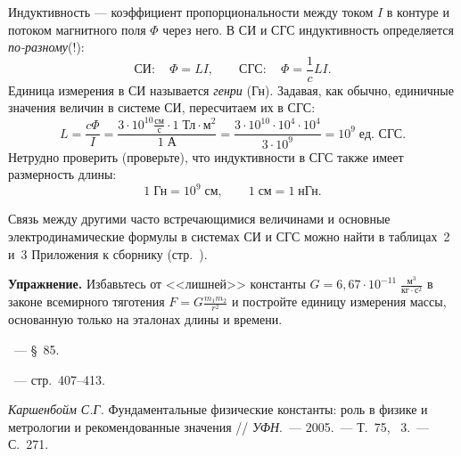 Индуктивность --- коэффициент пропорциональности между током $I$
в контуре и потоком магнитного поля $\Phi$ через него. В СИ и СГС
индуктивность определяется \emph{по-разному}(!):
\[
\text{СИ}:\quad\Phi=LI,\qquad\text{СГС}:\quad\Phi=\frac{1}{c}LI.
\]
Единица измерения в СИ называется \emph{генри} (Гн). Задавая, как
обычно, единичные значения величин в системе СИ, пересчитаем их в
СГС:
\[
L=\frac{c\Phi}{I}=\frac{3\cdot10^{10}\frac{\text{см}}{\text{с}}\cdot1\;\text{Тл}\cdot\text{м}^{2}}{1\;\text{А}}=\frac{3\cdot10^{10}\cdot10^{4}\cdot10^{4}}{3\cdot10^{9}}=10^{9}\;\text{ед. СГС}.
\]
Нетрудно проверить (проверьте), что индуктивности в СГС также имеет
размерность длины:
\[
1\;\text{Гн}=10^{9}\;\text{см},\qquad1\;\text{см}=1\;\text{нГн}.
\]

Связь между другими часто встречающимися величинами и основные
электродинамические формулы в системах СИ и СГС можно найти в
таблицах~2 и~3 Приложения к сборнику (стр.~\pageref{table:SICGS}).

\textbf{Упражнение.} Избавьтесь от <<лишней>> 
константы $G=6{,}67\cdot10^{-11}\;\frac{\text{м}^{3}}{\text{кг}\cdot\text{с}^{2}}$
в законе всемирного тяготения $F=G\frac{m_{1}m_{2}}{r^{2}}$ и постройте
единицу измерения массы, основанную только на эталонах
длины и времени.

\begin{lab:literature}
    \item \SivuhinIII~--- \S~85.
    \item \Kirichenko~--- стр.~407--413.
    \item *\textit{Каршенбойм С.Г.} Фундаментальные физические константы: роль
    в физике и метрологии и рекомендованные значения // \emph{УФН}.~--- 2005.~---
    Т.~75, \textnumero~3.~--- С.~271.
\end{lab:literature}



